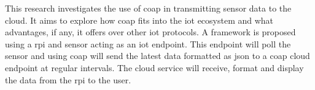 This research investigates the use of \gls{coap} in transmitting sensor data
to the cloud. It aims to explore how \gls{coap} fits into the \gls{iot} ecosystem and
what advantages, if any, it offers over other \gls{iot} protocols. A framework is proposed 
using a \gls{rpi} and sensor acting as an \gls{iot} endpoint. This endpoint will poll 
the sensor and using \gls{coap} will send the latest data formatted as \gls{json} to 
a \gls{coap} cloud endpoint at regular intervals.
The cloud service will receive, format and display the data from the \gls{rpi} 
to the user.